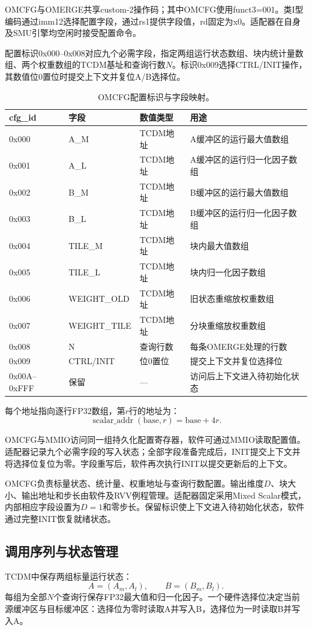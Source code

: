 \documentclass[journal]{IEEEtran}
\begin{document}
OMCFG与OMERGE共享custom-2操作码；其中OMCFG使用funct3=001。类I型编码通过imm12选择配置字段，通过rs1提供字段值，rd固定为x0。适配器在自身及SMU引擎均空闲时接受配置命令。

配置标识0x000--0x008对应九个必需字段，指定两组运行状态数组、块内统计量数组、两个权重数组的TCDM基址和查询行数$N$。标识0x009选择CTRL/INIT操作，其数值位0置位时提交上下文并复位A/B选择位。
\begin{table}[t]\centering\small
\caption{OMCFG配置标识与字段映射。}
\label{tab:cfg}
\begin{tabularx}{\linewidth}{lllY}
\toprule
cfg\_id & 字段 & 数值类型 & 用途\\
\midrule
0x000 & A\_M & TCDM地址 & A缓冲区的运行最大值数组\\
0x001 & A\_L & TCDM地址 & A缓冲区的运行归一化因子数组\\
0x002 & B\_M & TCDM地址 & B缓冲区的运行最大值数组\\
0x003 & B\_L & TCDM地址 & B缓冲区的运行归一化因子数组\\
0x004 & TILE\_M & TCDM地址 & 块内最大值数组\\
0x005 & TILE\_L & TCDM地址 & 块内归一化因子数组\\
0x006 & WEIGHT\_OLD & TCDM地址 & 旧状态重缩放权重数组\\
0x007 & WEIGHT\_TILE & TCDM地址 & 分块重缩放权重数组\\
0x008 & N & 查询行数 & 每条OMERGE处理的行数\\
0x009 & CTRL/INIT & 位0置位 & 提交上下文并复位选择位\\
0x00A--0xFFF & 保留 & --- & 访问后上下文进入待初始化状态\\
\bottomrule
\end{tabularx}
\end{table}
每个地址指向逐行FP32数组，第$r$行的地址为：
\[
 \operatorname{scalar\_addr}(\mathrm{base},r)=\mathrm{base}+4r.
\]

OMCFG与MMIO访问同一组持久化配置寄存器，软件可通过MMIO读取配置值。适配器记录九个必需字段的写入状态；全部字段准备完成后，INIT提交上下文并将选择位复位为零。字段重写后，软件再次执行INIT以提交更新后的上下文。

OMCFG负责标量状态、统计量、权重地址与查询行数配置。输出维度$D$、块大小、输出地址和步长由软件及RVV例程管理。适配器固定采用Mixed Scalar模式，内部相应字段设置为$D=1$和零步长。保留标识使上下文进入待初始化状态，软件通过完整INIT恢复就绪状态。

\subsection{调用序列与状态管理}
TCDM中保存两组标量运行状态：
\[
 A=(A_m,A_l),\qquad B=(B_m,B_l).
\]
每组为全部$N$个查询行保存FP32最大值和归一化因子。一个硬件选择位决定当前源缓冲区与目标缓冲区：选择位为零时读取A并写入B，选择位为一时读取B并写入A。
\end{document}
